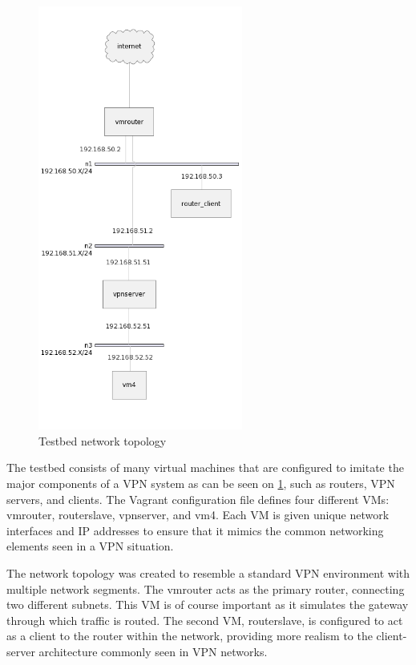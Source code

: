 \documentclass[12pt, fleqn, a4paper]{article}
\begin{document}
\begin{figure}[H]
	\centering
	\includegraphics[width=0.6\textwidth]{img/topology}
	\caption{Testbed network topology}
  \label{fig:topology}
\end{figure}

The testbed consists of many virtual machines that are configured to imitate the major components of a VPN system as can be seen on \cref{fig:topology}, such as routers, VPN servers, and clients. The Vagrant configuration file defines four different VMs: vmrouter, routerslave, vpnserver, and vm4. Each VM is given unique network interfaces and IP addresses to ensure that it mimics the common networking elements seen in a VPN situation.

The network topology was created to resemble a standard VPN environment with multiple network segments. The vmrouter acts as the primary router, connecting two different subnets. This VM is of course important as it simulates the gateway through which traffic is routed. The second VM, routerslave, is configured to act as a client to the router within the network, providing more realism to the client-server architecture commonly seen in VPN networks.
\end{document}
